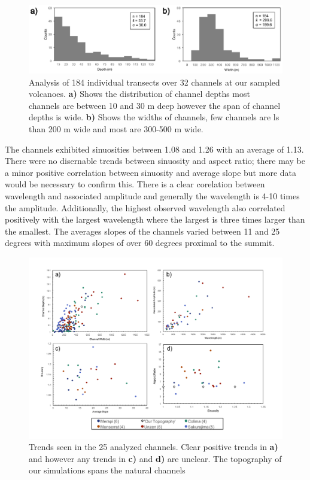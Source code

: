 \begin{figure}[h]
 \centering
 \includegraphics{dist.eps}
 \caption{ Analysis of 184 individual transects over 32 channels at our sampled volcanoes. \textbf{a)} Shows the distribution of channel depths most channels are between 10 and 30 m deep however the span of channel depths is wide. \textbf{b)} Shows the widths of channels, few channels are ls than 200 m wide and most are 300-500 m wide.}
 \label{fig:hist} 
\end{figure}

The channels exhibited sinuosities between 1.08 and 1.26 with an average of 1.13. There were no disernable trends between sinuosity and aspect ratio; there may be a minor positive correlation between sinuosity and average slope but more data would be necessary to confirm this. There is a clear corelation between wavelength and associated amplitude and generally the wavelength is 4-10 times the amplitude. Additionally, the highest observed wavelength also correlated positively with the largest wavelength where the largest is three times larger than the smallest. 
The averages slopes of the channels varied between 11 and 25 degrees with maximum slopes of over 60 degrees proximal to the summit. 

\begin{figure}[ht]
 \centering
 \includegraphics[width= \linewidth]{topography.png}
 \caption{ Trends seen in the 25 analyzed channels. Clear positive trends in \textbf{a)} and  however any trends in \textbf{c)} and \textbf{d)} are unclear. The topography of our simulations spans the natural channels}
 \label{fig:topo} 
\end{figure}


